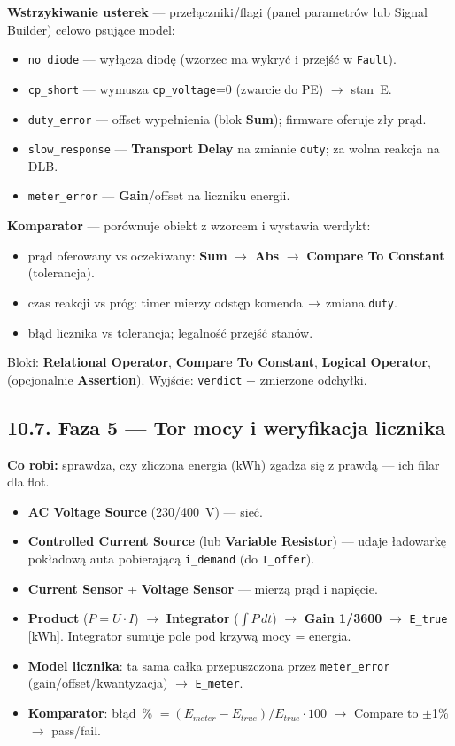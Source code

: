 \documentclass[11pt]{article}
\newcommand{\ra}{$\rightarrow$}
\newcommand{\key}[1]{\textbf{\color{navy}#1}}
\begin{document}
\key{Wstrzykiwanie usterek} --- przełączniki/flagi (panel parametrów lub Signal Builder) celowo psujące model:
\begin{itemize}
  \item \texttt{no\_diode} --- wyłącza diodę (wzorzec ma wykryć i przejść w \texttt{Fault}).
  \item \texttt{cp\_short} --- wymusza \texttt{cp\_voltage}=0 (zwarcie do PE) \ra{} stan~E.
  \item \texttt{duty\_error} --- offset wypełnienia (blok \key{Sum}); firmware oferuje zły prąd.
  \item \texttt{slow\_response} --- \key{Transport Delay} na zmianie \texttt{duty}; za wolna reakcja na DLB.
  \item \texttt{meter\_error} --- \key{Gain}/offset na liczniku energii.
\end{itemize}

\key{Komparator} --- porównuje obiekt z wzorcem i wystawia werdykt:
\begin{itemize}
  \item prąd oferowany vs oczekiwany: \key{Sum} \ra{} \key{Abs} \ra{} \key{Compare To Constant} (tolerancja).
  \item czas reakcji vs próg: timer mierzy odstęp komenda\,\ra\,zmiana \texttt{duty}.
  \item błąd licznika vs tolerancja; legalność przejść stanów.
\end{itemize}
Bloki: \key{Relational Operator}, \key{Compare To Constant}, \key{Logical Operator}, (opcjonalnie \key{Assertion}). Wyjście: \texttt{verdict} + zmierzone odchyłki.

\subsection{10.7. Faza 5 --- Tor mocy i weryfikacja licznika}

\key{Co robi:} sprawdza, czy zliczona energia (kWh) zgadza się z prawdą --- ich filar dla flot.
\begin{itemize}
  \item \key{AC Voltage Source} (230/400~V) --- sieć.
  \item \key{Controlled Current Source} (lub \key{Variable Resistor}) --- udaje ładowarkę pokładową auta pobierającą \texttt{i\_demand} (do \texttt{I\_offer}).
  \item \key{Current Sensor} + \key{Voltage Sensor} --- mierzą prąd i napięcie.
  \item \key{Product} ($P=U\cdot I$) \ra{} \key{Integrator} ($\int P\,dt$) \ra{} \key{Gain 1/3600} \ra{} \texttt{E\_true} [kWh]. Integrator sumuje pole pod krzywą mocy = energia.
  \item \key{Model licznika}: ta sama całka przepuszczona przez \texttt{meter\_error} (gain/offset/kwantyzacja) \ra{} \texttt{E\_meter}.
  \item \key{Komparator}: błąd~\% $=(E_{meter}-E_{true})/E_{true}\cdot 100$ \ra{} Compare to $\pm$1\% \ra{} pass/fail.
\end{itemize}
\end{document}
